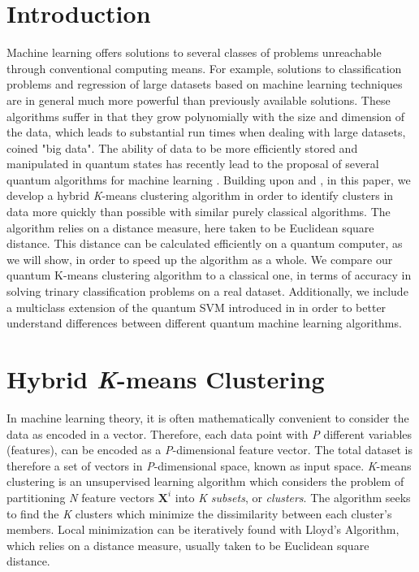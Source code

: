 \documentclass[twocolumn, english]{revtex4-2}
\begin{document}
\section{Introduction}
Machine learning offers solutions to several classes of problems unreachable through conventional computing means. For example, solutions to classification problems and regression of large datasets based on machine learning techniques are in general much more powerful than previously available solutions. These algorithms suffer in that they grow polynomially with the size and dimension of the data, which leads to substantial run times when dealing with large datasets, coined "big data". The ability of data to be more efficiently stored and manipulated in quantum states has recently lead to the proposal of several quantum algorithms for machine learning \cite{var_circ1, var_circ2, qml, autoencoders, feedforward, featureHilbertSpace, circuitcentric, lloydqsvm}. Building upon \cite{lloydlearning} and \cite{qmeans}, in this paper, we develop a hybrid \textit{K}-means clustering algorithm in order to identify clusters in data more quickly than possible with similar purely classical algorithms. The algorithm relies on a distance measure, here taken to be Euclidean square distance. This distance can be calculated efficiently on a quantum computer, as we will show, in order to speed up the algorithm as a whole. We compare our quantum K-means clustering algorithm to a classical one, in terms of accuracy in solving trinary classification problems on a real dataset. Additionally, we include a multiclass extension of the quantum SVM introduced in \cite{qsvm} in order to better understand differences between different quantum machine learning algorithms.

\section{Hybrid \textit{K}-means Clustering}

In machine learning theory, it is often mathematically convenient to consider the data as encoded in a vector. Therefore, each data point with \textit{P} different variables (features), can be encoded as a \textit{P}-dimensional feature vector. The total dataset is therefore a set of vectors in \textit{P}-dimensional space, known as input space. \textit{K}-means clustering is an unsupervised learning algorithm which considers the problem of partitioning \textit{N} feature vectors $\textbf{X}^{i}$ into \textit{K} \textit{subsets}, or \textit{clusters}. The algorithm seeks to find the \textit{K} clusters which minimize the dissimilarity between each cluster's members. Local minimization can be iteratively found with Lloyd's Algorithm, which relies on a distance measure, usually taken to be Euclidean square distance. 
\end{document}
